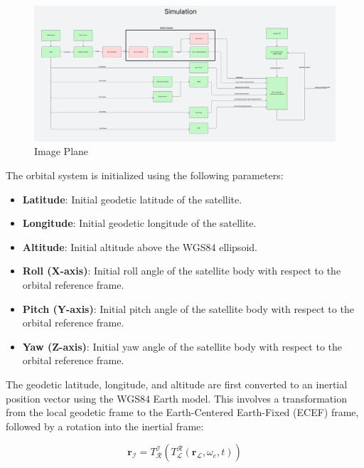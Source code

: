 \label{chap:sysInt}



\begin{figure}[H]
    \centering
    \includegraphics[width=1\linewidth]{figures/SystemIntegration/FullSystemDiagram.png}
    \caption{Image Plane}
    \label{fig4.2}
\end{figure}


The orbital system is initialized using the following parameters:

\begin{itemize}
    \item \textbf{Latitude}: Initial geodetic latitude of the satellite.
    \item \textbf{Longitude}: Initial geodetic longitude of the satellite.
    \item \textbf{Altitude}: Initial altitude above the WGS84 ellipsoid.
    \item \textbf{Roll (X-axis)}: Initial roll angle of the satellite body with respect to the orbital reference frame.
    \item \textbf{Pitch (Y-axis)}: Initial pitch angle of the satellite body with respect to the orbital reference frame.
    \item \textbf{Yaw (Z-axis)}: Initial yaw angle of the satellite body with respect to the orbital reference frame.
\end{itemize}

The geodetic latitude, longitude, and altitude are first converted to an inertial position vector using the WGS84 Earth model. This involves a transformation from the local geodetic frame to the Earth-Centered Earth-Fixed (ECEF) frame, followed by a rotation into the inertial frame:

\begin{equation}
    \mathbf{r}_\mathcal{I} = T_\mathcal{R}^\mathcal{I} \left( T_\mathcal{L}^{\mathcal{R}}(\mathbf{r}_\mathcal{L}, \omega_e, t) \right)
\end{equation}

